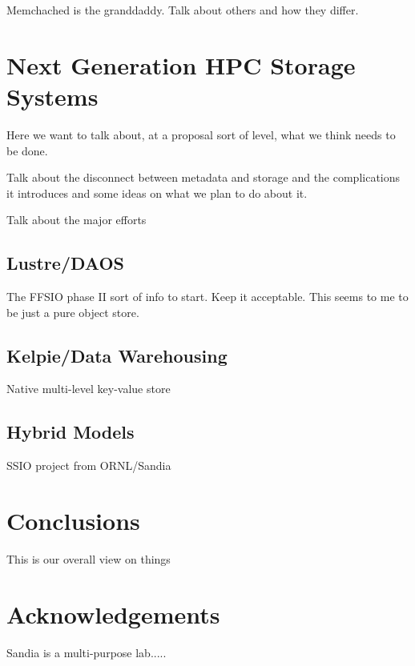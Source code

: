 Memchached is the granddaddy. Talk about others and how they differ.

\section{Next Generation HPC Storage Systems}\label{sec:intro}

Here we want to talk about, at a proposal sort of level, what we think needs
to be done.

Talk about the disconnect between metadata and storage and the complications
it introduces and some ideas on what we plan to do about it.

Talk about the major efforts

\subsection{Lustre/DAOS}

The FFSIO phase II sort of info to start. Keep it acceptable. This seems to me
to be just a pure object store.

\subsection{Kelpie/Data Warehousing}

Native multi-level key-value store

\subsection{Hybrid Models}

SSIO project from ORNL/Sandia

\section{Conclusions}\label{sec:intro}

This is our overall view on things

\section*{Acknowledgements}
Sandia is a multi-purpose lab.....


